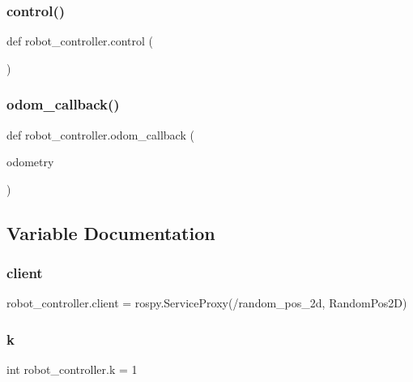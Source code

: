 \subsubsection{\texorpdfstring{control()}{control()}}
{\footnotesize\ttfamily def robot\+\_\+controller.\+control (\begin{DoxyParamCaption}{ }\end{DoxyParamCaption})}

\mbox{\label{namespacerobot__controller_acf806cd6684de6668604e261d4341aee}} 
\subsubsection{\texorpdfstring{odom\+\_\+callback()}{odom\_callback()}}
{\footnotesize\ttfamily def robot\+\_\+controller.\+odom\+\_\+callback (\begin{DoxyParamCaption}\item[{}]{odometry }\end{DoxyParamCaption})}



\subsection{Variable Documentation}
\mbox{\label{namespacerobot__controller_a091c74e8004fd80216a8b14f8354153d}} 
\subsubsection{\texorpdfstring{client}{client}}
{\footnotesize\ttfamily robot\+\_\+controller.\+client = rospy.\+Service\+Proxy(\textquotesingle{}/random\+\_\+pos\+\_\+2d\textquotesingle{}, Random\+Pos2D)}

\mbox{\label{namespacerobot__controller_aa848ff1d1e6f8078c8cc9dec8e82c028}} 
\subsubsection{\texorpdfstring{k}{k}}
{\footnotesize\ttfamily int robot\+\_\+controller.\+k = 1}

